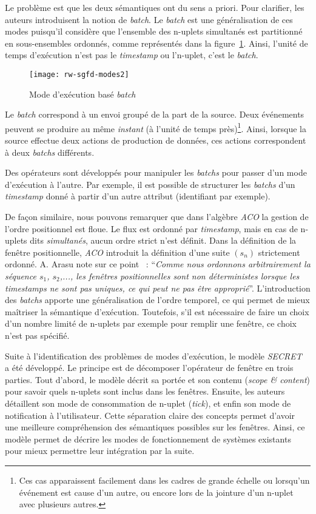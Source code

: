 Le problème est que les deux sémantiques ont du sens a priori. Pour clarifier, les auteurs introduisent la notion de \textit{batch}. Le \textit{batch} est une généralisation de ces modes puisqu'il considère que l'ensemble des n-uplets simultanés est partitionné en sous-ensembles ordonnés, comme représentés dans la figure~\ref{fig:rw:sgfd:mode:batch}. Ainsi, l'unité de temps d'exécution n'est pas le \textit{timestamp} ou l'n-uplet, c'est le \textit{batch}.
\begin{figure}[ht]
    \centering
		\texttt{[image: rw-sgfd-modes2]}
    \caption{Mode d'exécution basé \textit{batch}}\label{fig:rw:sgfd:mode:batch}
\end{figure}

Le \textit{batch} correspond à un envoi groupé de la part de la source. Deux événements peuvent se produire au même \textit{instant} (à l'unité de temps près)\footnote{Ces cas apparaissent facilement dans les cadres de grande échelle ou lorsqu'un événement est cause d'un autre, ou encore lors de la jointure d'un n-uplet avec plusieurs autres.}. Ainsi, lorsque la source effectue deux actions de production de données, ces actions correspondent à deux \textit{batchs} différents.

Des opérateurs sont développés pour manipuler les \textit{batchs} pour passer d'un mode d'exécution à l'autre. Par exemple, il est possible de structurer les \textit{batchs} d'un \textit{timestamp} donné à partir d'un autre attribut (identifiant par exemple).

De façon similaire, nous pouvons remarquer que dans l'algèbre \textit{ACO} la gestion de l'ordre positionnel est floue. Le flux est ordonné par \textit{timestamp}, mais en cas de n-uplets dits \textit{simultanés}, aucun ordre strict n'est définit. Dans la définition de la fenêtre positionnelle, \textit{ACO} introduit la définition d'une suite $(s_n)$ strictement ordonné. A. Arasu note sur ce point~\cite{Arasu:queries} : \enquote{\it Comme nous ordonnons arbitrairement la séquence $s_1$, $s_2$,..., les fenêtres positionnelles sont non déterministes lorsque les \textit{timestamps} ne sont pas uniques, ce qui peut ne pas être approprié}. L'introduction des \textit{batchs} apporte une généralisation de l'ordre temporel, ce qui permet de mieux maîtriser la sémantique d'exécution. Toutefois, s'il est nécessaire de faire un choix d'un nombre limité de n-uplets par exemple pour remplir une fenêtre, ce choix n'est pas spécifié.

Suite à l'identification des problèmes de modes d'exécution, le modèle \textit{SECRET}~\cite{Botan:secret} a été développé. Le principe est de décomposer l'opérateur de fenêtre en trois parties. Tout d'abord, le modèle décrit sa portée et son contenu (\textit{scope \& content}) pour savoir quels n-uplets sont inclus dans les fenêtres. Ensuite, les auteurs détaillent son mode de consommation de n-uplet (\textit{tick}), et enfin son mode de notification à l'utilisateur. Cette séparation claire des concepts permet d'avoir une meilleure compréhension des sémantiques possibles sur les fenêtres. Ainsi, ce modèle permet de décrire les modes de fonctionnement de systèmes existants pour mieux permettre leur intégration par la suite.

